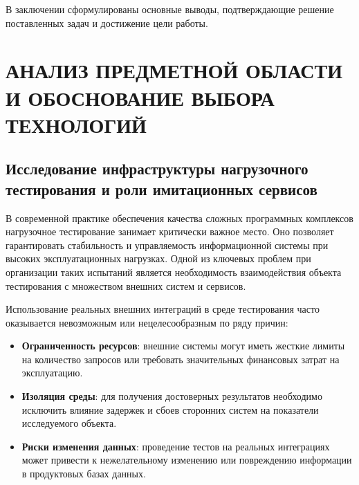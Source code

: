 \documentclass[
]{article}
\begin{document}
В заключении сформулированы основные выводы, подтверждающие решение
поставленных задач и достижение цели работы.

\section{АНАЛИЗ ПРЕДМЕТНОЙ ОБЛАСТИ И ОБОСНОВАНИЕ ВЫБОРА
ТЕХНОЛОГИЙ}\label{ux430ux43dux430ux43bux438ux437-ux43fux440ux435ux434ux43cux435ux442ux43dux43eux439-ux43eux431ux43bux430ux441ux442ux438-ux438-ux43eux431ux43eux441ux43dux43eux432ux430ux43dux438ux435-ux432ux44bux431ux43eux440ux430-ux442ux435ux445ux43dux43eux43bux43eux433ux438ux439}

\subsection{Исследование инфраструктуры нагрузочного тестирования и роли
имитационных
сервисов}\label{ux438ux441ux441ux43bux435ux434ux43eux432ux430ux43dux438ux435-ux438ux43dux444ux440ux430ux441ux442ux440ux443ux43aux442ux443ux440ux44b-ux43dux430ux433ux440ux443ux437ux43eux447ux43dux43eux433ux43e-ux442ux435ux441ux442ux438ux440ux43eux432ux430ux43dux438ux44f-ux438-ux440ux43eux43bux438-ux438ux43cux438ux442ux430ux446ux438ux43eux43dux43dux44bux445-ux441ux435ux440ux432ux438ux441ux43eux432}

В современной практике обеспечения качества сложных программных
комплексов нагрузочное тестирование занимает критически важное место.
Оно позволяет гарантировать стабильность и управляемость информационной
системы при высоких эксплуатационных нагрузках. Одной из ключевых
проблем при организации таких испытаний является необходимость
взаимодействия объекта тестирования с множеством внешних систем и
сервисов.

Использование реальных внешних интеграций в среде тестирования часто
оказывается невозможным или нецелесообразным по ряду причин:

\begin{itemize}
\item
  \textbf{Ограниченность ресурсов}: внешние системы могут иметь жесткие
  лимиты на количество запросов или требовать значительных финансовых
  затрат на эксплуатацию.
\item
  \textbf{Изоляция среды}: для получения достоверных результатов
  необходимо исключить влияние задержек и сбоев сторонних систем на
  показатели исследуемого объекта.
\item
  \textbf{Риски изменения данных}: проведение тестов на реальных
  интеграциях может привести к нежелательному изменению или повреждению
  информации в продуктовых базах данных.
\end{itemize}
\end{document}
